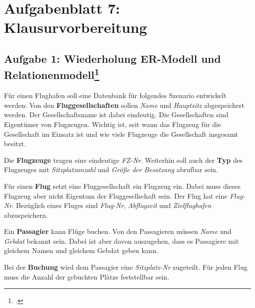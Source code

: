 \documentclass{lehramt-informatik}
\begin{document}
\chapter{Aufgabenblatt 7: Klausurvorbereitung}

%

\section{Aufgabe 1: Wiederholung ER-Modell und Relationenmodell\footcite{db:ab:7}}

Für einen Flughafen soll eine Datenbank für folgendes Szenario
entwickelt werden: Von den \textbf{Fluggesellschaften} sollen
\emph{Name} und \emph{Hauptsitz} abgespeichert werden. Der
Gesellschaftsname ist dabei eindeutig. Die Gesellschaften sind
Eigentümer von Flugzeugen. Wichtig ist, seit wann das Flugzeug für die
Gesellschaft im Einsatz ist und wie viele Flugzeuge die Gesellschaft
insgesamt besitzt.

Die \textbf{Flugzeuge} tragen eine eindeutige \emph{FZ-Nr}.
Weiterhin soll auch der \textbf{Typ} des Flugzeuges mit
\emph{Sitzplatzanzahl} und \emph{Größe der Besatzung} abrufbar sein.

Für einen \textbf{Flug} setzt eine Fluggesellschaft ein Flugzeug ein.
Dabei muss dieses Flugzeug aber nicht Eigentum der Fluggesellschaft
sein. Der Flug hat eine \emph{Flug-Nr}. Bezüglich eines Fluges sind
\emph{Flug-Nr}, \emph{Abflugzeit} und \emph{Zielflughafen} abzuspeichern.

Ein \textbf{Passagier} kann Flüge buchen. Von den Passagieren müssen
\emph{Name} und \emph{Gebdat} bekannt sein. Dabei ist aber davon
auszugehen, dass es Passagiere mit gleichem Namen und gleichem
Gebdat geben kann.

Bei der \textbf{Buchung} wird dem Passagier eine \emph{Sitzplatz-Nr}
zugeteilt. Für jeden Flug muss die Anzahl der gebuchten Plätze
feststellbar sein.
\end{document}
